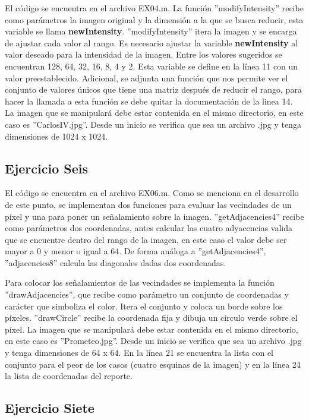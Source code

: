 \documentclass[
  journal=largetwo,
  manuscript=Practica-Dos,
  year=2024-1, %
  volume=37,
  spanish, %
]{cup-journal}
\begin{document}
El código se encuentra en el archivo EX04.m. La función ''modifyIntensity'' recibe como parámetros la imagen original y la dimensión a la que se busca reducir,  esta variable se llama \textbf{newIntensity}. ''modifyIntensity'' itera la imagen y se encarga de ajustar cada valor al rango. Es necesario ajustar la variable \textbf{newIntensity} al valor deseado para la intensidad de la imagen. Entre los valores sugeridos se encuentran 128, 64, 32, 16, 8, 4 y 2. Esta variable se define en la línea 11 con un valor preestablecido. Adicional, se adjunta una función que nos permite ver el conjunto de valores únicos que tiene una matriz después de reducir el rango, para hacer la llamada a esta función se debe quitar la documentación de la linea 14. La imagen que se manipulará debe estar contenida en el mismo directorio, en este caso es ''CarlosIV.jpg''. Desde un inicio se verifica que sea un archivo .jpg y tenga dimensiones de 1024 x 1024.

\subsection{Ejercicio Seis}

El código se encuentra en el archivo EX06.m. Como se menciona en el desarrollo de este punto, se implementan dos funciones para evaluar las vecindades de un píxel y una para poner un señalamiento sobre la imagen. ''getAdjacencies4'' recibe como parámetros dos coordenadas, antes calcular las cuatro adyacencias valida que se encuentre dentro del rango de la imagen, en este caso el valor debe ser mayor a 0 y menor o igual a 64. De forma análoga a ''getAdjacencies4'', ''adjacencies8'' calcula las diagonales dadas dos coordenadas.

Para colocar los señalamientos de las vecindades se implementa la función ''drawAdjacencies'', que recibe como parámetro un conjunto de coordenadas y carácter que simboliza el color. Itera el conjunto y coloca un borde sobre los píxeles. ''drawCircle'' recibe la coordenada fija y dibuja un circulo verde sobre el píxel. La imagen que se manipulará debe estar contenida en el mismo directorio, en este caso es ''Prometeo.jpg''. Desde un inicio se verifica que sea un archivo .jpg y tenga dimensiones de 64 x 64. En la línea 21 se encuentra la lista con el conjunto  para el peor de los casos (cuatro esquinas de la imagen) y en la línea 24 la lista de coordenadas del reporte.


\subsection{Ejercicio Siete}
\end{document}
